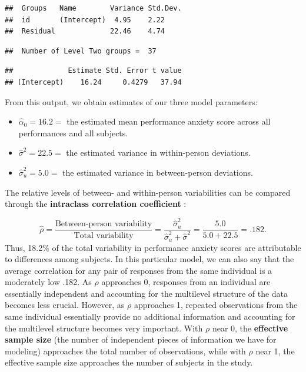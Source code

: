 \documentclass[
]{krantz}
\providecommand{\tightlist}{%
  \setlength{\itemsep}{0pt}\setlength{\parskip}{0pt}}
\begin{document}
\begin{verbatim}
##  Groups   Name        Variance Std.Dev.
##  id       (Intercept)  4.95    2.22    
##  Residual             22.46    4.74
\end{verbatim}

\begin{verbatim}
##  Number of Level Two groups =  37
\end{verbatim}

\begin{verbatim}
##             Estimate Std. Error t value
## (Intercept)    16.24     0.4279   37.94
\end{verbatim}

From this output, we obtain estimates of our three model parameters:

\begin{itemize}
\tightlist
\item
  \(\hat{\alpha}_{0}=16.2=\) the estimated mean performance anxiety score across all performances and all subjects.
\item
  \(\hat{\sigma}^2=22.5=\) the estimated variance in within-person deviations.
\item
  \(\hat{\sigma}_{u}^{2}=5.0=\) the estimated variance in between-person deviations.
\end{itemize}

The relative levels of between- and within-person variabilities can be compared through the \textbf{intraclass correlation coefficient} :

\begin{equation*}
\hat{\rho}=\frac{\textrm{Between-person variability}}{\textrm{Total variability}} = \frac{\hat{\sigma}_{u}^{2}}{\hat{\sigma}_{u}^{2}+\hat{\sigma}^2} = \frac{5.0}{5.0+22.5} = .182.
\end{equation*}
Thus, 18.2\% of the total variability in performance anxiety scores are attributable to differences among subjects. In this particular model, we can also say that the average correlation for any pair of responses from the same individual is a moderately low .182. As \(\rho\) approaches 0, responses from an individual are essentially independent and accounting for the multilevel structure of the data becomes less crucial. However, as \(\rho\) approaches 1, repeated observations from the same individual essentially provide no additional information and accounting for the multilevel structure becomes very important. With \(\rho\) near 0, the \textbf{effective sample size}  (the number of independent pieces of information we have for modeling) approaches the total number of observations, while with \(\rho\) near 1, the effective sample size approaches the number of subjects in the study.
\end{document}
